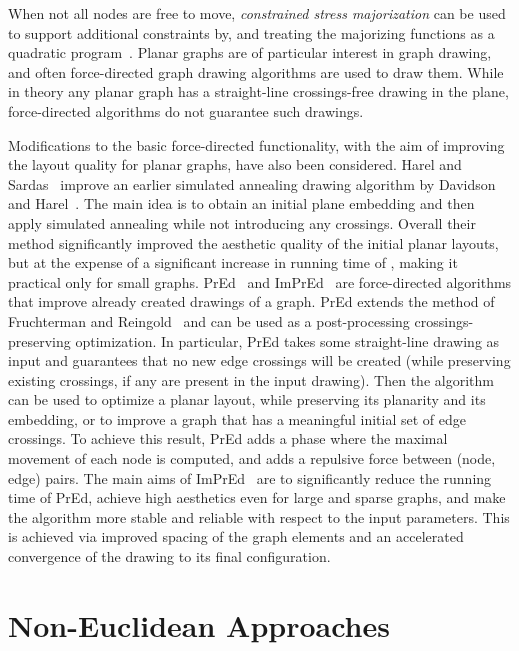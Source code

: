 \documentclass[notitlepage,letter,11pt]{article}
\begin{document}
When not all nodes are free to move, {\em constrained
stress majorization} can be used to support additional constraints by,
and treating the majorizing functions as a quadratic program~\cite{DBLP:journals/dm/DwyerKM09}.
Planar graphs are of particular interest in graph drawing, and often
force-directed graph drawing algorithms are used to draw
them. While in theory any planar graph has a straight-line
crossings-free drawing in the plane, force-directed algorithms do not
guarantee such drawings. 

Modifications to the basic force-directed functionality, with the aim of improving the layout quality for planar graphs, have also been considered. Harel and Sardas~\cite{harel98algorithm} improve an earlier simulated annealing drawing algorithm by Davidson and Harel~\cite{dh-dgnus-96}. The main idea is to obtain an initial plane embedding and then apply simulated annealing while not introducing any crossings. Overall their method significantly improved the aesthetic quality of the initial planar layouts, but at the expense of a significant increase in running time of , making it practical only for small graphs.
PrEd~\cite{Bertault-pred-00} and {ImPrEd}~\cite{simonetto-11} are
force-directed algorithms that improve already created drawings of a graph.
PrEd extends the method of Fruchterman and Reingold~\cite{fr-gdfdp-91}
and can be used as a post-processing crossings-preserving
optimization. In particular, PrEd takes some straight-line drawing as
input and guarantees that no new edge crossings will be created (while
preserving existing crossings, if any are present in the input
drawing). Then the algorithm can be used to optimize a planar layout,
while preserving its planarity and its embedding, or to improve a
graph that has a meaningful initial set of edge crossings. To achieve
this result, PrEd adds a phase where the maximal movement of each node
is computed, and adds a repulsive force between (node, edge) pairs. 
The main aims of ImPrEd~\cite{simonetto-11} are to significantly
reduce the running time of PrEd, achieve high aesthetics even for
large and sparse graphs, and make the algorithm more stable and
reliable with respect to the input parameters. This is achieved via
improved spacing of the graph elements and an accelerated convergence
of the drawing to its final configuration.



\section{Non-Euclidean Approaches}
\label{fd:sec:nea}
\end{document}
